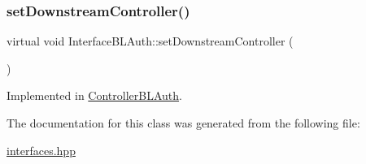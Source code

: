 \subsubsection{\texorpdfstring{set\+Downstream\+Controller()}{setDownstreamController()}}
{\footnotesize\ttfamily virtual void Interface\+B\+L\+Auth\+::set\+Downstream\+Controller (\begin{DoxyParamCaption}\item[{\hyperlink{class_stub_p_r}{Stub\+PR} $\ast$}]{ }\end{DoxyParamCaption})\hspace{0.3cm}{\ttfamily [pure virtual]}}



Implemented in \hyperlink{class_controller_b_l_auth_ae514249d909d1449d23f1d2fe7b85eea}{Controller\+B\+L\+Auth}.



The documentation for this class was generated from the following file\+:\begin{DoxyCompactItemize}
\item 
\hyperlink{interfaces_8hpp}{interfaces.\+hpp}\end{DoxyCompactItemize}
